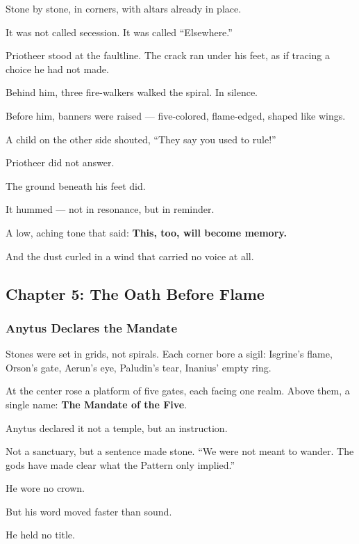 \documentclass[12pt]{article}
\begin{document}
Stone by stone,  
in corners,  
with altars already in place.

It was not called secession.  
It was called “Elsewhere.”

Priotheer stood at the faultline.  
The crack ran under his feet,  
as if tracing a choice he had not made.

Behind him, three fire-walkers walked the spiral.  
In silence.

Before him, banners were raised —  
five-colored, flame-edged, shaped like wings.

A child on the other side shouted,  
 “They say you used to rule!”

Priotheer did not answer.

The ground beneath his feet did.

It hummed —  
not in resonance,  
but in reminder.

A low, aching tone  
that said:  
 \textbf{This, too, will become memory.}

And the dust curled in a wind  
that carried no voice at all.

\newpage

\subsection{Chapter 5: The Oath Before Flame}

\vspace{.5in}

\subsubsection{Anytus Declares the Mandate}

Stones were set in grids, not spirals.  
Each corner bore a sigil:  
Isgrine’s flame, Orson’s gate, Aerun’s eye, Paludin’s tear, Inanius’ empty ring.

At the center rose a platform of five gates, each facing one realm.  
Above them, a single name: \textbf{The Mandate of the Five}.

Anytus declared it not a temple, but an instruction.  

Not a sanctuary, but a sentence made stone.  
 “We were not meant to wander.  
 The gods have made clear what the Pattern only implied.”

He wore no crown.  

But his word moved faster than sound.  

He held no title.  
\end{document}
